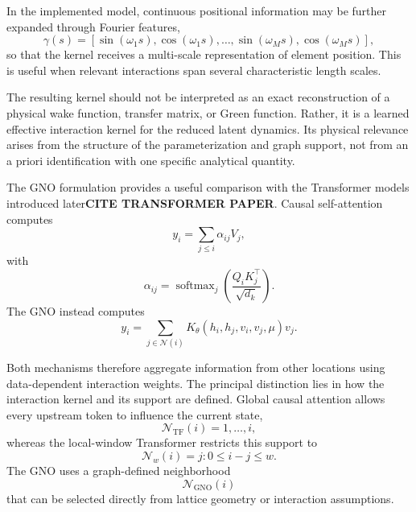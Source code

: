 \documentclass[11pt,a4paper]{article}
\begin{document}
\begin{sloppypar}
In the implemented model, continuous positional information may be further expanded through Fourier features,
\begin{equation}
\gamma(s)
=
\left[
\sin(\omega_1 s),
\cos(\omega_1 s),
\ldots,
\sin(\omega_M s),
\cos(\omega_M s)
\right],
\label{eq:gno_fourier_features}
\end{equation}
so that the kernel receives a multi-scale representation of element position. This is useful when relevant interactions span several characteristic length scales.

The resulting kernel should not be interpreted as an exact reconstruction of a physical wake function, transfer matrix, or Green function. Rather, it is a learned effective interaction kernel for the reduced latent dynamics. Its physical relevance arises from the structure of the parameterization and graph support, not from an a priori identification with one specific analytical quantity.

The GNO formulation provides a useful comparison with the Transformer models introduced later\textbf{CITE TRANSFORMER PAPER}. Causal self-attention computes
\begin{equation}
y_i
=
\sum_{j\le i}
\alpha_{ij}
V_j,
\label{eq:gno_attention_general}
\end{equation}
with
\begin{equation}
\alpha_{ij}
=
\operatorname{softmax}_{j}
\left(
\frac{
Q_iK_j^{\top}
}{
\sqrt{d_k}
}
\right).
\label{eq:gno_attention_weights}
\end{equation}
The GNO instead computes
\begin{equation}
y_i
=
\sum_{j\in\mathcal{N}(i)}
K_{\theta}
\left(
h_i,
h_j,
v_i,
v_j,
\mu
\right)
v_j.
\label{eq:gno_kernel_sum}
\end{equation}

Both mechanisms therefore aggregate information from other locations using data-dependent interaction weights. The principal distinction lies in how the interaction kernel and its support are defined. Global causal attention allows every upstream token to influence the current state,
\begin{equation}
\mathcal{N}_{\mathrm{TF}}(i)
=
{1,\ldots,i},
\end{equation}
whereas the local-window Transformer restricts this support to
\begin{equation}
\mathcal{N}_{w}(i)
=
{
j:
0\le i-j\le w
}.
\end{equation}
The GNO uses a graph-defined neighborhood
\begin{equation}
\mathcal{N}_{\mathrm{GNO}}(i)
\end{equation}
that can be selected directly from lattice geometry or interaction assumptions.


\end{sloppypar}
\end{document}
